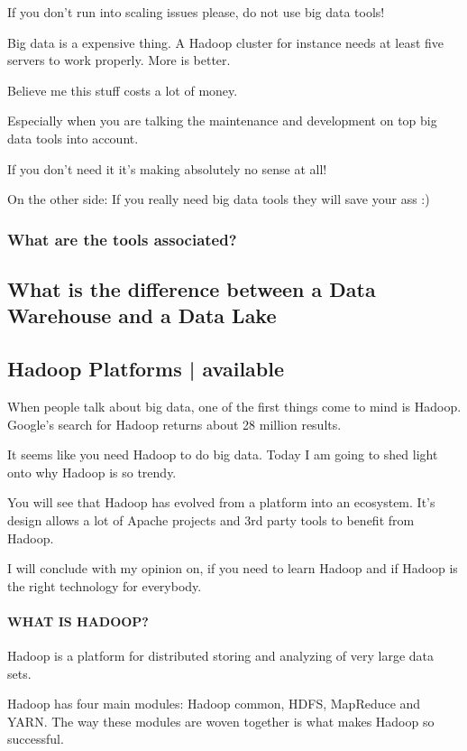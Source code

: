 \documentclass[12pt]{scrartcl} %
\begin{document}
If you don’t run into scaling issues please, do not use big data tools!

Big data is a expensive thing. A Hadoop cluster for instance needs at least five servers to work properly. More is better.

Believe me this stuff costs a lot of money.

Especially when you are talking the maintenance and development on top big data tools into account.

If you don’t need it it’s making absolutely no sense at all!

On the other side: If you really need big data tools they will save your ass :)

\subsubsection{What are the tools associated?}



\subsection{What is the difference between a Data Warehouse and a Data Lake}
 
\subsection{Hadoop Platforms | available}
When people talk about big data, one of the first things come to mind is Hadoop. Google’s search for Hadoop returns about 28 million results.

It seems like you need Hadoop to do big data. Today I am going to shed light onto why Hadoop is so trendy.

You will see that Hadoop has evolved from a platform into an ecosystem. It’s design allows a lot of Apache projects and 3rd party tools to benefit from Hadoop.

I will conclude with my opinion on, if you need to learn Hadoop and if Hadoop is the right technology for everybody.

\paragraph{WHAT IS HADOOP?}

Hadoop is a platform for distributed storing and analyzing of very large data sets.

Hadoop has four main modules: Hadoop common, HDFS, MapReduce and YARN. The way these modules are woven together is what makes Hadoop so successful.
\end{document}
